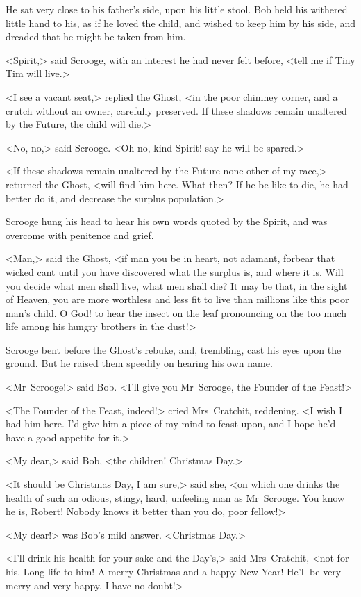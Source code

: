 He sat very close to his father's side, upon his little stool. Bob held his withered little hand to his, as if he loved the child, and wished to keep him by his side, and dreaded that he might be taken from him.

<Spirit,> said Scrooge, with an interest he had never felt before, <tell me if Tiny Tim will live.>

<I see a vacant seat,> replied the Ghost, <in the poor chimney corner, and a crutch without an owner, carefully preserved. If these shadows remain unaltered by the Future, the child will die.>

<No, no,> said Scrooge. <Oh no, kind Spirit! say he will be spared.>

<If these shadows remain unaltered by the Future none other of my race,> returned the Ghost, <will find him here. What then? If he be like to die, he had better do it, and decrease the surplus population.>

Scrooge hung his head to hear his own words quoted by the Spirit, and was overcome with penitence and grief.

<Man,> said the Ghost, <if man you be in heart, not adamant, forbear that wicked cant until you have discovered what the surplus is, and where it is. Will you decide what men shall live, what men shall die? It may be that, in the sight of Heaven, you are more worthless and less fit to live than millions like this poor man's child. O God! to hear the insect on the leaf pronouncing on the too much life among his hungry brothers in the dust!>

Scrooge bent before the Ghost's rebuke, and, trembling, cast his eyes upon the ground. But he raised them speedily on hearing his own name.

<Mr~Scrooge!> said Bob. <I'll give you Mr~Scrooge, the Founder of the Feast!>

<The Founder of the Feast, indeed!> cried Mrs~Cratchit, reddening. <I wish I had him here. I'd give him a piece of my mind to feast upon, and I hope he'd have a good appetite for it.>

<My dear,> said Bob, <the children! Christmas Day.>

<It should be Christmas Day, I am sure,> said she, <on which one drinks the health of such an odious, stingy, hard, unfeeling man as Mr~Scrooge. You know he is, Robert! Nobody knows it better than you do, poor fellow!>

<My dear!> was Bob's mild answer. <Christmas Day.>

<I'll drink his health for your sake and the Day's,> said Mrs~Cratchit, <not for his. Long life to him! A merry Christmas and a happy New Year! He'll be very merry and very happy, I have no doubt!>

